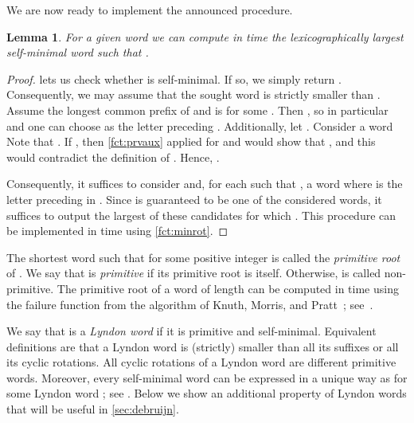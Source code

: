 \documentclass{article}
\newcommand{\mayqed}{}
\newtheorem{lemma}[theorem]{Lemma}
\theoremstyle{definition}
\theoremstyle{remark}
\begin{document}
We are now ready to implement the announced procedure.

\begin{lemma}\label{lem:prv}
  For a given word  we can compute in  time the
  lexicographically largest self-minimal word  such that .
\end{lemma}
\begin{proof}
   lets us check whether  is self-minimal. If so, we simply return .
  Consequently, we may assume that the sought word  is strictly smaller than .
  Assume the longest common prefix of  and  
  is  for some .
  Then , so
  in particular  and one can choose 
  as the letter preceding . Additionally, let .
  Consider a word 
  Note that .
  If , then \cref{fct:prvaux} applied for  and 
  would show that , and this would contradict the definition of .
  Hence, .
    
  Consequently, it suffices to consider  and,
  for each  such that ,
  a word  where  is the letter preceding  in .
  Since  is guaranteed to be one of the considered words,
  it suffices to output the largest of these candidates for which .
  This procedure can be implemented in  time using \cref{fct:minrot}.
\mayqed\end{proof}

The shortest word  such that  for some positive integer  is called the
\emph{primitive root} of . We say that  is \emph{primitive} if its primitive root is  itself.
Otherwise,  is called non-primitive.
The primitive root of a word of length  can be computed in  time 
using the failure function from the algorithm of Knuth, Morris, and Pratt~\cite{DBLP:journals/siamcomp/KnuthMP77};
see~\cite{AlgorithmsOnStrings}.

We say that  is a \emph{Lyndon word} if it is primitive and self-minimal.
Equivalent definitions are that a Lyndon word is (strictly) smaller than all its suffixes or all its cyclic rotations.
All cyclic rotations of a Lyndon word are different primitive words.
Moreover, every self-minimal word can be expressed in a unique way as 
for some Lyndon word ; see \cite{Lothaire}.
Below we show an additional property of Lyndon words that will be useful in \cref{sec:debruijn}.
\end{document}
